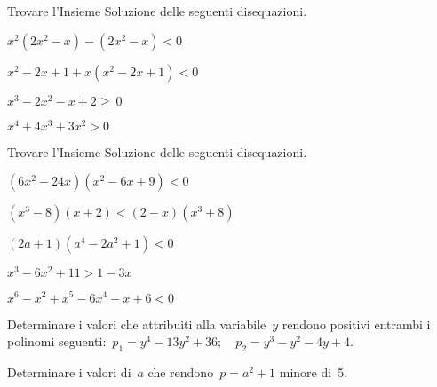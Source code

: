 \begin{esercizio}[\Ast]
 \label{ese:21.48}
Trovare l'Insieme Soluzione delle seguenti disequazioni.
\begin{multicols}{2}
 \begin{enumeratea}
 \item $x^{2}(2x^{2}-x)-(2x^{2}-x)<0$
\item $x^{2}-2x+1+x(x^{2}-2x+1)<0$
\item $x^{3}-2x^{2}-x+2\ge~0$
\item $x^{4}+4x^{3}+3x^{2}>0$
\end{enumeratea}
\end{multicols}
\end{esercizio}

\begin{esercizio}[\Ast]
 \label{ese:21.49}
Trovare l'Insieme Soluzione delle seguenti disequazioni.
\begin{multicols}{2}
 \begin{enumeratea}
 \item $(6x^{2}-24x)(x^{2}-6x+9)<0$
\item $(x^{3}-8)(x+2)<(2-x)(x^{3}+8)$
\item $(2a+1)(a^{4}-2a^{2}+1)<0$
\item $x^{3}-6x^{2}+11>1-3x$
\item $x^{6}-x^{2}+x^{5}-6x^{4}-x+6<0$
\end{enumeratea}
\end{multicols}
\end{esercizio}

\begin{esercizio}[\Ast]
 \label{ese:21.50}
 Determinare i valori che attribuiti alla variabile~$y$ rendono positivi
entrambi i polinomi
seguenti:~$p_{1}=y^{4}-13y^{2}+36;\quad p_{2}=y^{3}-y^{2}-4y+4.$
\end{esercizio}

\begin{esercizio}[\Ast]
 \label{ese:21.51}
 Determinare i valori di~$a$ che rendono~$p=a^{2}+1$ minore di~5.
\end{esercizio}

